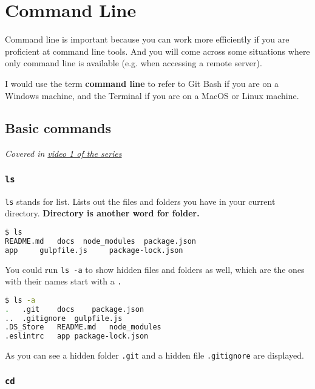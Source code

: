 \chapter{Command Line}
\label{sec:cmd}

Command line is important because you can work more efficiently if you are proficient at command line tools. And you will come across some situations where only command line is available (e.g. when accessing a remote server).

I would use the term \textbf{command line} to refer to Git Bash if you are on a Windows machine, and the Terminal if you are on a MacOS or Linux machine. 

\section{Basic commands}

\textit{Covered in \href{https://www.youtube.com/watch?v=oIsH0V3fRt8&list=PLjGmdnqrOKuYXiu7lgG5HW71jPEUd1XCm&index=2}{video 1 of the series}}

\subsection{\texttt{ls}}

\texttt{ls} stands for list. Lists out the files and folders you have in your current directory. \textbf{Directory is another word for folder.}
\vspace{6mm}

\begin{lstlisting}[language=bash]
$ ls
README.md   docs  node_modules  package.json    
app     gulpfile.js     package-lock.json
\end{lstlisting}

You could run \texttt{ls -a} to show hidden files and folders as well, which are the ones with their names start with a \texttt{.}

\begin{lstlisting}[language=bash]
$ ls -a
.   .git    docs    package.json
..  .gitignore  gulpfile.js
.DS_Store   README.md   node_modules
.eslintrc   app package-lock.json
\end{lstlisting}

As you can see a hidden folder \texttt{.git} and a hidden file \texttt{.gitignore} are displayed.

\subsection{\texttt{cd}}

